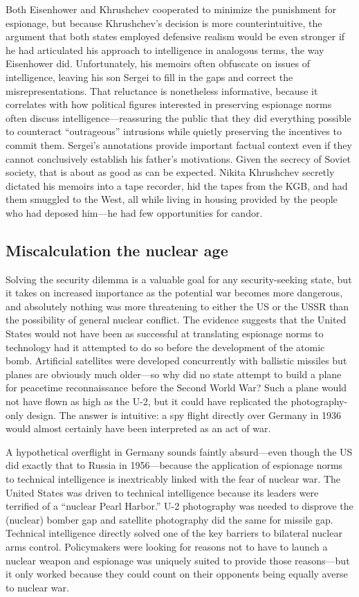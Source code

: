 \documentclass{memoir}
\begin{document}
Both Eisenhower and Khrushchev cooperated to minimize the punishment for espionage, but because Khrushchev's decision is more counterintuitive, the argument that both states employed defensive realism would be even stronger if he had articulated his approach to intelligence in analogous terms, the way Eisenhower did. Unfortunately, his memoirs often obfuscate on issues of intelligence, leaving his son Sergei to fill in the gaps and correct the misrepresentations. That reluctance is nonetheless informative, because it correlates with how political figures interested in preserving espionage norms often discuss intelligence---reassuring the public that they did everything possible to counteract ``outrageous'' intrusions while quietly preserving the incentives to commit them. Sergei's annotations provide important factual context even if they cannot conclusively establish his father's motivations. Given the secrecy of Soviet society, that is about as good as can be expected. Nikita Khrushchev secretly dictated his memoirs into a tape recorder, hid the tapes from the KGB, and had them smuggled to the West, all while living in housing provided by the people who had deposed him---he had few opportunities for candor.

\subsection{Miscalculation the nuclear age}
Solving the security dilemma is a valuable goal for any security-seeking state, but it takes on increased importance as the potential war becomes more dangerous, and absolutely nothing was more threatening to either the US or the USSR than the possibility of general nuclear conflict. The evidence suggests that the United States would not have been as successful at translating espionage norms to technology had it attempted to do so before the development of the atomic bomb. Artificial satellites were developed concurrently with ballistic missiles but planes are obviously much older---so why did no state attempt to build a plane for peacetime reconnaissance before the Second World War? Such a plane would not have flown as high as the U-2, but it could have replicated the photography-only design. The answer is intuitive: a spy flight directly over Germany in 1936 would almost certainly have been interpreted as an act of war.

A hypothetical overflight in Germany sounds faintly absurd---even though the US did exactly that to Russia in 1956---because the application of espionage norms to technical intelligence is inextricably linked with the fear of nuclear war. The United States was driven to technical intelligence because its leaders were terrified of a ``nuclear Pearl Harbor.'' U-2 photography was needed to disprove the (nuclear) bomber gap and satellite photography did the same for missile gap. Technical intelligence directly solved one of the key barriers to bilateral nuclear arms control. Policymakers were looking for reasons not to have to launch a nuclear weapon and espionage was uniquely suited to provide those reasons---but it only worked because they could count on their opponents being equally averse to nuclear war.
\end{document}
